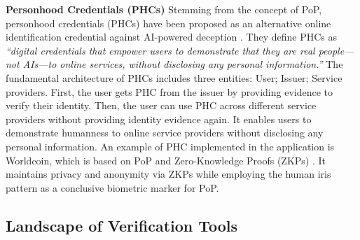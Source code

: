 \textbf{Personhood Credentials (PHCs)} Stemming from the concept of PoP, personhood credentials (PHCs) have been proposed as an alternative online identification credential against AI-powered deception \cite{adler2024personhood}. They define PHCs as \textit{``digital credentials that empower users to demonstrate that they are
real people—not AIs—to online services, without disclosing any personal information.''} The fundamental architecture of PHCs includes three entities: User; Issuer; Service providers. First, the user gets PHC from the issuer by providing evidence to verify their identity. Then, the user can use PHC across different service providers without providing identity evidence again. It enables users to demonstrate humanness to online service providers without disclosing any personal information. 
An example of PHC implemented in the application is Worldcoin, which is based on PoP and Zero-Knowledge Proofs (ZKPs) \cite{WorldWhitepaper, worldHumanness, de2024personhood}. It maintains privacy and anonymity via ZKPs while employing the human iris pattern as a conclusive biometric marker for PoP. %

\vspace{-2mm}
\subsection{Landscape of Verification Tools}
\vspace{-2mm}
